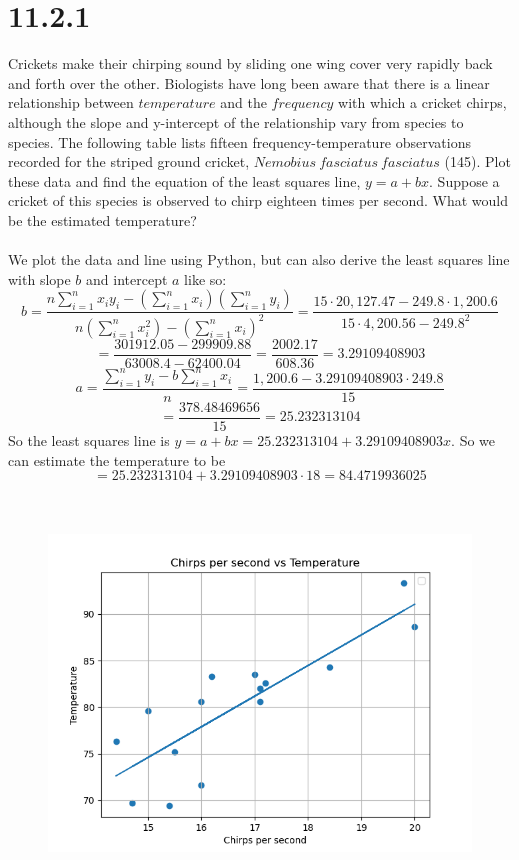 \documentclass{article}
\begin{document}
\thispagestyle{firstpageheader}
{\Large 

\section*{11.2.1}
Crickets make their chirping sound by sliding one wing cover very rapidly back and forth over the other. Biologists have long been aware that there is a linear relationship between \(temperature\) and the \(frequency\) with which a cricket chirps, although the slope and y-intercept of the relationship vary from species to species. The following table lists fifteen frequency-temperature observations recorded for the striped ground cricket, \(Nemobius ~ fasciatus ~ fasciatus\) (145). Plot these data and find the equation of the least squares line, \(y = a+bx\). Suppose a cricket of this species is observed to chirp eighteen times per second. What would be the estimated temperature?
\\
\\
We plot the data and line using Python, but can also derive the least squares line with slope \(b\) and intercept \(a\) like so:
\[
b = \frac{n\sum_{i=1}^n x_i y_i - (\sum_{i=1}^n x_i) (\sum_{i=1}^{n} y_i)}{n(\sum_{i=1}^n x_i^2) - (\sum_{i=1}^{n} x_i)^2} = \frac{15 \cdot 20,127.47 - 249.8 \cdot 1,200.6}{15 \cdot 4,200.56 - 249.8^2}
\]
\[
= \frac{301912.05 - 299909.88}{63008.4 - 62400.04} = \frac{2002.17}{608.36} = 3.29109408903
\]
\[
a = \frac{\sum_{i=1}^{n} y_i - b \sum_{i=1}^{n}x_i}{n} = \frac{1,200.6 - 3.29109408903 \cdot 249.8}{15}
\]
\[
= \frac{378.48469656}{15} = 25.232313104
\]
So the least squares line is \(y = a + bx = 25.232313104 + 3.29109408903x\). So we can estimate the temperature to be 
\[
= 25.232313104 + 3.29109408903 \cdot 18 = 84.4719936025
\]
\\
\\
\begin{figure}[h!]
  \centering
  \includegraphics[width=500pt]{cricket_1121.png}

\end{figure}}
\end{document}
